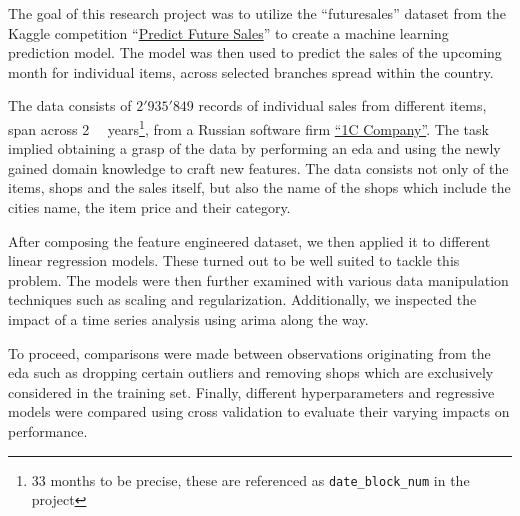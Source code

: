 The goal of this research project was to utilize the \enquote{\gls{futuresales}} dataset from the Kaggle competition \enquote{\href{https://www.kaggle.com/c/competitive-data-science-predict-future-sales}{Predict Future Sales}} to create a machine learning prediction model.
The model was then used to predict the sales of the upcoming month for individual items, across selected branches spread within the country.

The data consists of $2'935'849$ records of individual sales from different items, span across \mbox{2 \textonehalf} \ years\footnote{33 months to be precise, these are referenced as \texttt{date\_block\_num} in the project}, from a Russian software firm \href{https://1c.ru/eng/title.htm}{\enquote{1C Company}}.
The task implied obtaining a grasp of the data by performing an \acrfull{eda} and using the newly gained domain knowledge to craft new features.
The data consists not only of the items, shops and the sales itself, but also the name of the shops which include the cities name, the item price and their category.

After composing the feature engineered dataset, we then applied it to different linear regression models. These turned out to be well suited to tackle this problem.
The models were then further examined with various data manipulation techniques such as scaling and regularization.
Additionally, we inspected the impact of a time series analysis using \acrshort{arima} along the way.

To proceed, comparisons were made between observations originating from the \acrshort{eda} such as dropping certain outliers and removing shops which are exclusively considered in the training set.
Finally, different \glspl{hyperparameter} and regressive models were compared using cross validation to evaluate their varying impacts on performance.
